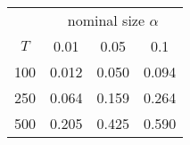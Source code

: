 % 
\begin{tabular}{cccc}
  \hline
  & \multicolumn{3}{c}{nominal size $\alpha$} \\
 $T$ & 0.01 & 0.05 & 0.1 \\
 \hline
100 & 0.012 & 0.050 & 0.094 \\ 
  250 & 0.064 & 0.159 & 0.264 \\ 
  500 & 0.205 & 0.425 & 0.590 \\ 
   \hline
\end{tabular}
